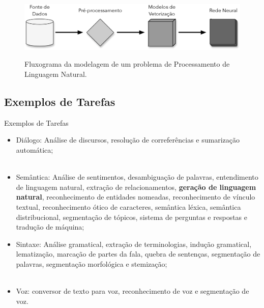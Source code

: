 \begin{frame}
	\begin{figure}[!ht]
		\centering
		\includegraphics[scale=0.4]{figs/nlp_workflow.eps}	
		\label{f.nlp_workflow}
		\caption{Fluxograma da modelagem de um problema de Processamento de Linguagem Natural.}
	\end{figure}
\end{frame}

\subsection{Exemplos de Tarefas}
\label{ss.tasks}

\begin{frame}{Exemplos de Tarefas}
	\begin{itemize}
		\justifying
		\item Diálogo: Análise de discursos, resolução de correferências e sumarização automática;
		\\~\\
		\item \begin{sloppypar}Semântica: Análise de sentimentos, desambiguação de palavras, entendimento de linguagem natural, extração de relacionamentos, \textbf{geração de linguagem natural}, reconhecimento de entidades nomeadas, reconhecimento de vínculo textual, reconhecimento ótico de caracteres, semântica léxica, semântica distribucional, segmentação de tópicos, sistema de perguntas e respostas e tradução de máquina;	\end{sloppypar}
		\end{itemize}
\end{frame}

\begin{frame}
	\begin{itemize}
		\justifying
		\item Sintaxe: Análise gramatical, extração de terminologias, indução gramatical, lematização, marcação de partes da fala, quebra de sentenças, segmentação de palavras, segmentação morfológica e stemização;
		\\~\\
		\item Voz: conversor de texto para voz, reconhecimento de voz e segmentação de voz.
		\end{itemize}
\end{frame}

